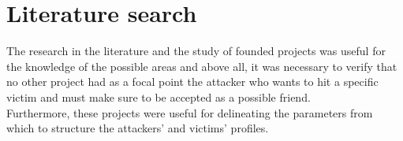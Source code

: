 

\chapter{Literature search}
\label{cap:literature-search}
The research in the literature and the study of founded projects was useful for the knowledge of the possible areas and above all, it was necessary to verify that no other project had as a focal point the attacker who wants to hit a specific victim and must make sure to be accepted as a possible friend. \\
Furthermore, these projects were useful for delineating the parameters from which to structure the attackers' and victims' profiles.
